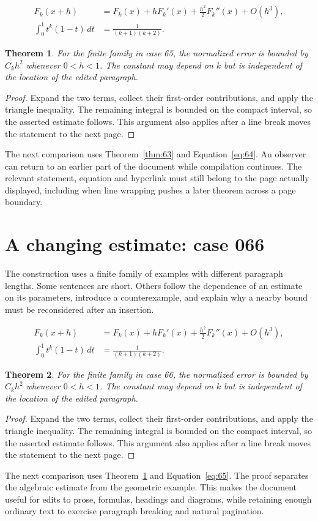 \documentclass[a4paper,10pt]{article}
\newtheorem{theorem}{Theorem}[section]
\begin{document}
\lipsum[13-14]
\begin{align}\label{eq:64}
 F_k(x+h)&=F_k(x)+hF_k'(x)+\frac{h^2}{2}F_k''(x)+O(h^3),\\
 \int_0^1 t^k(1-t)\,dt&=\frac{1}{(k+1)(k+2)}.
\end{align}
\begin{theorem}\label{thm:64}
For the finite family in case 65, the normalized error is bounded by $C_k h^2$ whenever $0<h<1$. The constant may depend on $k$ but is independent of the location of the edited paragraph.
\end{theorem}
\begin{proof}
Expand the two terms, collect their first-order contributions, and apply the
triangle inequality. The remaining integral is bounded on the compact interval,
so the asserted estimate follows. This argument also applies after a line break
moves the statement to the next page.
\end{proof}
The next comparison uses Theorem~\ref{thm:63} and Equation~\ref{eq:64}. An observer can return to an earlier part of the document while compilation continues. The relevant statement, equation and hyperlink must still belong to the page actually displayed, including when line wrapping pushes a later theorem across a page boundary.

\lipsum[23]

\section{A changing estimate: case 066}\label{unit:65}
The construction uses a finite family of examples with different paragraph lengths. Some sentences are short. Others follow the dependence of an estimate on its parameters, introduce a counterexample, and explain why a nearby bound must be reconsidered after an insertion.

\lipsum[16-17]
\begin{align}\label{eq:65}
 F_k(x+h)&=F_k(x)+hF_k'(x)+\frac{h^2}{2}F_k''(x)+O(h^3),\\
 \int_0^1 t^k(1-t)\,dt&=\frac{1}{(k+1)(k+2)}.
\end{align}
\begin{theorem}\label{thm:65}
For the finite family in case 66, the normalized error is bounded by $C_k h^2$ whenever $0<h<1$. The constant may depend on $k$ but is independent of the location of the edited paragraph.
\end{theorem}
\begin{proof}
Expand the two terms, collect their first-order contributions, and apply the
triangle inequality. The remaining integral is bounded on the compact interval,
so the asserted estimate follows. This argument also applies after a line break
moves the statement to the next page.
\end{proof}
The next comparison uses Theorem~\ref{thm:64} and Equation~\ref{eq:65}. The proof separates the algebraic estimate from the geometric example. This makes the document useful for edits to prose, formulas, headings and diagrams, while retaining enough ordinary text to exercise paragraph breaking and natural pagination.
\end{document}
